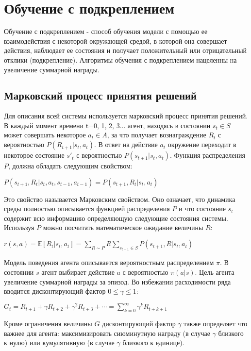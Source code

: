 \documentclass{mipt-thesis-bs}
\begin{document}
\mainmatter


\chapter{Обучение с подкреплением}

Обучение с подкреплением - способ обучения модели с помощью ее взаимодействия с некоторой окружающей средой, в которой она совершает действия, наблюдает ее состояния и получает положительный или отрицательный отклики (подкрепление). Алгоритмы обучения с подкреплением нацеленны на увеличение суммарной награды.

\section{Марковский процесс принятия решений}
Для описания всей системы используется марковский процесс принятия решений. В каждый момент времени t=0, 1, 2, 3... агент, находясь в состоянии $s_t\in S$ может совершать некоторое $a_t\in A$, за что получает вознаграждение $R_t$ с вероятностью $P(R_{t+1}|s_t,a_t)$. В ответ на действие $a_t$ окружение переходит в некоторое состояние $s'_t$ с вероятностью $P(s_{t+1}|s_t,a_t)$. Функция распределения $P$, должна обладать следующим свойством:

$P(s_{t+1}, R_{t}|s_t,a_t,s_{t-1},a_{t-1}) = P(s_{t+1}, R_{t}|s_t,a_t)$

Это свойство называется Марковским свойством. Оно означает, что динамика среды полностью описывается функцией распределения $P$ и что состояние $s_t$ содержит всю информацию определяющую следующие состояния системы. Используя $P$ можно посчитать математическое ожидание величины $R$:

$r(s, a) = \mathbb{E}[R_{t} | s_t, a_t]=\sum_{R \sim P} R \sum_{s_{t+1} \in S} P(s_{t+1}, R | s_t, a_t)$

Модель поведения агента описывается вероятностным распределением $\pi$. В состоянии $s$ агент выбирает действие $a$ с вероятностью $\pi(a|s)$. Цель агента увеличение суммарной награды за эпизод. Во избежании расходимости ряда вводится дисконтирующий фактор $0 \leq\gamma\leq 1$:

$G_{t} = R_{t+1}+\gamma R_{t+2}+\gamma^{2} R_{t+3}+\cdots=\sum_{k=0}^{\infty} \gamma^{k} R_{t+k+1}$

Кроме ограничения величины $G$ дисконтирующий фактор $\gamma$ также определяет что важнее для агента: максимизировать сиюминутную награду (в случае $\gamma$ близкого к нулю) или кумулятивную (в случае $\gamma$ близкого к единице).
\end{document}
